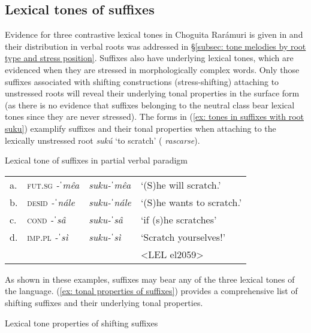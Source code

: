 \subsection{Lexical tones of suffixes}
\label{subsec: lexical tone in suffixes}

Evidence for three contrastive lexical tones in Choguita Rarámuri is given in  and their distribution in verbal roots was addressed in §\ref{subsec: tone melodies by root type and stress position}. Suffixes also have underlying lexical tones, which are evidenced when they are stressed in morphologically complex words. Only those suffixes associated with shifting constructions (stress-shifting) attaching to unstressed roots will reveal their underlying tonal properties in the surface form (as there is no evidence that suffixes belonging to the neutral class bear lexical tones since they are never stressed). The forms in (\ref{ex: tones in suffixes with root suku}) examplify suffixes and their tonal properties when attaching to the lexically unstressed root \textit{sukú} `to scratch' ( \textit{rascarse}).

\ea\label{ex: tones in suffixes with root suku}
{Lexical tone of suffixes in partial verbal paradigm}

\begin{tabular}{llll}
     a. & \textsc{fut.sg} \textit{-ˈmêa} &  {\textit{suku-ˈmêa}} & {‘(S)he will scratch.’} \\
     b. & \textsc{desid} \textit{-ˈnále} & {\textit{suku-ˈnále}} & {‘(S)he wants to scratch.’}\\
     c. & \textsc{cond} \textit{-ˈsâ} & {\textit{suku-ˈsâ}} & {‘if (s)he scratches’}\\
     d. & \textsc{imp.pl} \textit{-ˈsì} & {\textit{suku-ˈsì}} & {`Scratch yourselves!'}\\
        & & & <LEL el2059>\\
\end{tabular}
    \z


As shown in these examples, suffixes may bear any of the three lexical tones of the language. (\ref{ex: tonal properties of suffixes}) provides a comprehensive list of shifting suffixes and their underlying tonal properties.

\newpage
\TabPositions{2cm, 3.5cm, 6cm}
\ea\label{ex: tonal properties of suffixes}
{Lexical tone properties of shifting suffixes}


